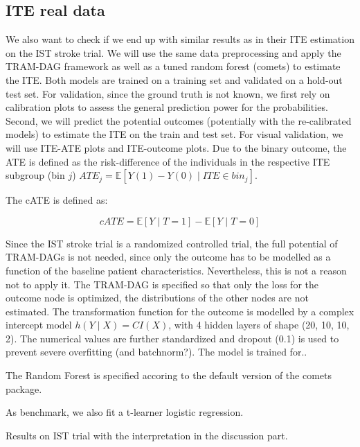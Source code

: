 \subsection{ITE real data}

We also want to check if we end up with similar results as \citet{chen2025} in their ITE estimation on the IST stroke trial. We will use the same data preprocessing and apply the TRAM-DAG framework as well as a tuned random forest (comets) to estimate the ITE. Both models are trained on a training set and validated on a hold-out test set. For validation, since the ground truth is not known, we first rely on calibration plots to assess the general prediction power for the probabilities. Second, we will predict the potential outcomes (potentially with the re-calibrated models) to estimate the ITE on the train and test set. For visual validation, we will use ITE-ATE plots and ITE-outcome plots. Due to the binary outcome, the ATE is defined as the risk-difference of the individuals in the respective ITE subgroup (bin $j$) $ATE_j = \mathbb{E}[Y(1) - Y(0) \mid ITE \in bin_j]$.

The cATE is defined as:

\begin{equation}
cATE = \mathbb{E}[Y \mid T = 1] - \mathbb{E}[Y \mid T = 0]
\end{equation}

Since the IST stroke trial is a randomized controlled trial, the full potential of TRAM-DAGs is not needed, since only the outcome has to be modelled as a function of the baseline patient characteristics. Nevertheless, this is not a reason not to apply it. The TRAM-DAG is specified so that only the loss for the outcome node is optimized, the distributions of the other nodes are not estimated. The transformation function for the outcome is modelled by a complex intercept model $h(Y \mid X) = CI(X)$, with 4 hidden layers of shape (20, 10, 10, 2). The numerical values are further standardized and dropout (0.1) is used to prevent severe overfitting (and batchnorm?). The model is trained for..

The Random Forest is specified accoring to the default version of the comets package.

As benchmark, we also fit a t-learner logistic regression.

Results on IST trial with the interpretation in the discussion part.


